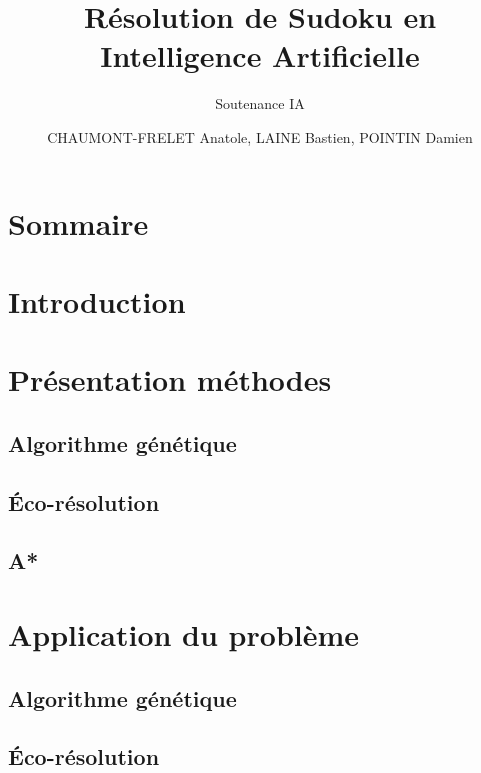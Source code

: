 \documentclass{beamer}
\title{Résolution de Sudoku en Intelligence Artificielle}
\subtitle{Soutenance IA}
\author{CHAUMONT-FRELET Anatole, LAINE Bastien, POINTIN Damien}
\institute{Génie Mathématique | INSA Rouen}
\begin{document}
    \beamertemplatenavigationsymbolsempty

    \begin{frame}
        \titlepage{}
    \end{frame}

    \section*{Sommaire}
        \begin{frame}
            \tableofcontents
        \end{frame}

    \section{Introduction}
        \subsection{}
            

    \section{Présentation méthodes}
        \subsection{Algorithme génétique}
            
        \subsection{Éco-résolution}
            
        \subsection{A*}
            
    \section{Application du problème}
        \subsection{Algorithme génétique}
            
        \subsection{Éco-résolution}
            
\end{document}

